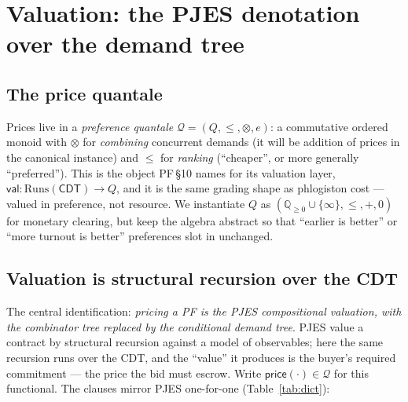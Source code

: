 \documentclass[11pt]{article}
\theoremstyle{definition}
\newcommand{\PF}{\textsf{PF}}
\newcommand{\CDT}{\textsf{CDT}}
\newcommand{\val}{\ensuremath{\mathsf{val}}}
\newcommand{\price}{\ensuremath{\mathsf{price}}}
\newcommand{\Qval}{\mathcal{Q}}            %
\newcommand{\Runs}{\mathrm{Runs}}
\begin{document}
\section{Valuation: the PJES denotation over the demand tree}\label{sec:val}

\subsection{The price quantale}
Prices live in a \emph{preference quantale} $\Qval = (Q, \le, \otimes, e)$: a commutative ordered
monoid with $\otimes$ for \emph{combining} concurrent demands (it will be addition of prices in the
canonical instance) and $\le$ for \emph{ranking} (``cheaper'', or more generally ``preferred''). This
is the object \PF{}\,\S10 names for its valuation layer, $\val:\Runs(\CDT)\to Q$, and it is the same
grading shape as phlogiston cost --- valued in preference, not resource. We instantiate $Q$ as
$(\mathbb{Q}_{\ge 0}\cup\{\infty\}, \le, +, 0)$ for monetary clearing, but keep the algebra abstract
so that ``earlier is better'' or ``more turnout is better'' preferences slot in unchanged.

\subsection{Valuation is structural recursion over the CDT}
The central identification: \emph{pricing a \PF{} is the PJES compositional valuation, with the
combinator tree replaced by the conditional demand tree}. PJES value a contract by structural
recursion against a model of observables; here the same recursion runs over the \CDT{}, and the
``value'' it produces is the buyer's required commitment --- the price the bid must escrow. Write
$\price(\cdot)\in\Qval$ for this functional. The clauses mirror PJES one-for-one
(Table~\ref{tab:dict}):
\end{document}
